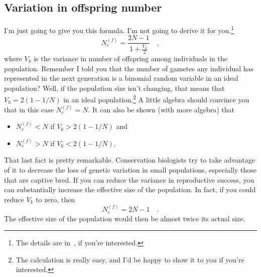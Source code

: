 \documentclass[12pt]{article}
\begin{document}
\subsection*{Variation in offspring number}

I'm just going to give you this formula. I'm not going to derive it
for you.\footnote{The details are in~\cite{Crow-Kimura-1970}, if
  you're interested.}
\[
N_e^{(f)} = \frac{2N - 1}{1 + \frac{V_k}{2}} \quad ,
\]
where $V_k$ is the variance in number of offspring among individuals
in the population.  Remember I told you that the number of gametes any
individual has represented in the next generation is a binomial random
variable in an ideal population? Well, if the population size isn't
changing, that means that $V_k = 2(1 - 1/N)$ in an ideal
population.\footnote{The calculation is really easy, and I'd be happy
  to show it to you if you're interested.} A little algebra should
convince you that in this case $N_e^{(f)} = N$. It can also be shown
(with more algebra) that

\begin{itemize}

\item $N_e^{(f)} < N$ if $V_k > 2(1 - 1/N)$ and

\item $N_e^{(f)} > N$ if $V_k < 2(1 - 1/N)$.

\end{itemize}

\noindent That last fact is pretty remarkable. Conservation biologists
try to take advantage of it to decrease the loss of genetic variation
in small populations, especially those that are captive bred. If you
can reduce the variance in reproductive success, you can substantially
increase the effective size of the population. In fact, if you could
reduce $V_k$ to zero, then
\[
N_e^{(f)} = 2N - 1 \quad .
\]
The effective size of the population would then be almost twice its
actual size.




\ccLicense
\end{document}
